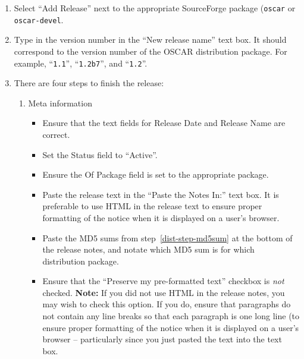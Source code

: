 \begin{enumerate}
{\bf Note:} Stable distribution packages are released under the ``{\tt
  oscar}'' SourceForge package; development/beta distribution packages
  are released under the ``{\tt oscar-devel} SourceForge package.

\item Select ``Add Release'' next to the appropriate SourceForge
  package ({\tt oscar} or {\tt oscar-devel}.

\item Type in the version number in the ``New release name'' text
  box.  It should correspond to the version number of the OSCAR
  distribution package.  For example, ``{\tt 1.1}'', ``{\tt 1.2b7}'',
  and ``{\tt 1.2}''.

\item There are four steps to finish the release:

  \begin{enumerate}

    \item Meta information
      \begin{itemize}
      \item Ensure that the text fields for Release Date and Release
        Name are correct.
        
      \item Set the Status field to ``Active''.
        
      \item Ensure the Of Package field is set to the appropriate
        package.
        
      \item Paste the release text in the ``Paste the Notes In:'' text
        box.  It is preferable to use HTML in the release text to
        ensure proper formatting of the notice when it is displayed on
        a user's browser.
        
      \item Paste the MD5 sums from step~\ref{dist-step-md5sum} at the
        bottom of the release notes, and notate which MD5 sum is for
        which distribution package.

      \item Ensure that the ``Preserve my pre-formatted text''
        checkbox is {\em not} checked.  {\bf Note:} If you did not use
        HTML in the release notes, you may wish to check this option.
        If you do, ensure that paragraphs do not contain any line
        breaks so that each paragraph is one long line (to ensure
        proper formatting of the notice when it is displayed on a
        user's browser -- particularly since you just pasted the text
        into the text box.


\end{itemize}
\end{enumerate}
\end{enumerate}
